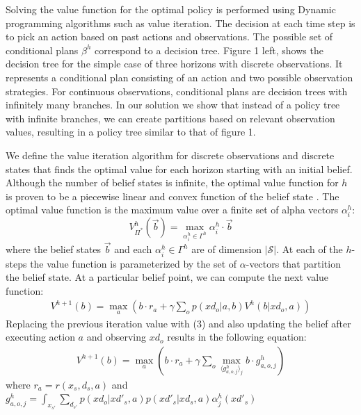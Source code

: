 \documentclass{article} %
\begin{document}
Solving the value function for the optimal policy is performed using Dynamic programming algorithms such as value iteration. 
The decision at each time step is to pick an action based on past actions and observations. The possible set of conditional plans $\beta^h$ correspond to a decision tree. Figure 1 left, shows the decision tree for the simple case of three horizons with discrete observations. It represents a conditional plan consisting of an action and two possible observation strategies. For continuous observations, conditional plans are decision trees with infinitely many branches. In our solution we show that instead of a policy tree with infinite branches, we can create partitions based on relevant observation values, resulting in a policy tree similar to that of figure 1. %

We define the value iteration algorithm for discrete observations and discrete states that finds the optimal value for each horizon starting with an initial belief. Although the number of belief states is infinite, the optimal value function for $h$ is proven to be a piecewise linear and convex function of the belief state \cite{smallwoodSondik}. The optimal value function is the maximum value over a finite set of alpha vectors  $\alpha^h_i$:%
\begin{equation}
V^h_{\Pi^*}(\vec{b}) = \max_{\alpha^h_i \in \Gamma^h} \alpha^h_i \cdot \vec{b}
\end{equation}
where the belief states $\vec{b}$ and each $\alpha^h_i \in \Gamma^h$ are of dimension $|\mathcal{S}|$. At each of the $h$-steps the value function is parameterized by the set of  $\alpha$-vectors that partition the belief state. 
At a particular belief point, we can compute the next value function: 
\begin{align*}
V^{h+1}(b) = \max_a \left( b \cdot r_a + \gamma \sum_o p(xd_o|a,b)V^h(b|xd_o,a)\right)\nonumber
\end{align*}
Replacing the previous iteration value with (3) and also updating the belief after executing action $a$ and observing $xd_o$ results in the following equation: 
\begin{align*}
V^{h+1}(b) = \max_a \left( b \cdot r_a + 
\gamma \sum_o \max_{\langle g^h_{a,o,j} \rangle_j}  b \cdot g^h_{a,o,j} \right)\nonumber
\end{align*}
where $r_a = r(x_s,d_s,a)$ and  
$g^h_{a,o,j} =  \int_{x_{s'}} \sum_{d_{s'}} p(xd_o|xd'_s,a)p(xd'_s|xd_s,a) \alpha^h_j(xd'_s)$
\end{document}
